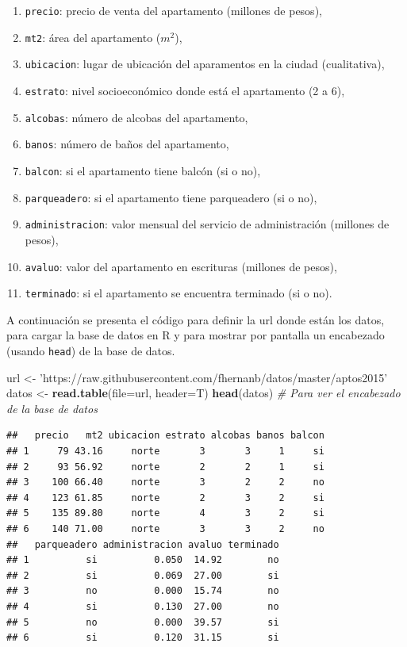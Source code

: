 \documentclass[10pt,]{krantz}
\makeatletter
\newenvironment{Shaded}{\begin{snugshade}}{\end{snugshade}}
\newcommand{\KeywordTok}[1]{\textcolor[rgb]{0.13,0.29,0.53}{\textbf{#1}}}
\newcommand{\DataTypeTok}[1]{\textcolor[rgb]{0.13,0.29,0.53}{#1}}
\newcommand{\StringTok}[1]{\textcolor[rgb]{0.31,0.60,0.02}{#1}}
\newcommand{\CommentTok}[1]{\textcolor[rgb]{0.56,0.35,0.01}{\textit{#1}}}
\newcommand{\NormalTok}[1]{#1}
\providecommand{\tightlist}{%
  \setlength{\itemsep}{0pt}\setlength{\parskip}{0pt}}
\newenvironment{kframe}{%
\medskip{}
\setlength{\fboxsep}{.8em}
 \def\at@end@of@kframe{}%
 \ifinner\ifhmode%
  \def\at@end@of@kframe{\end{minipage}}%
  \begin{minipage}{\columnwidth}%
 \fi\fi%
 \def\FrameCommand##1{\hskip\@totalleftmargin \hskip-\fboxsep
 \colorbox{shadecolor}{##1}\hskip-\fboxsep
     \hskip-\linewidth \hskip-\@totalleftmargin \hskip\columnwidth}%
 \MakeFramed {\advance\hsize-\width
   \@totalleftmargin\z@ \linewidth\hsize
   \@setminipage}}%
 {\par\unskip\endMakeFramed%
 \at@end@of@kframe}
\renewenvironment{Shaded}{\begin{kframe}}{\end{kframe}}
\makeatother
\begin{document}
\begin{enumerate}
\def\labelenumi{\arabic{enumi}.}
\tightlist
\item
  \texttt{precio}: precio de venta del apartamento (millones de pesos),
\item
  \texttt{mt2}: área del apartamento (\(m^2\)),
\item
  \texttt{ubicacion}: lugar de ubicación del aparamentos en la ciudad
  (cualitativa),
\item
  \texttt{estrato}: nivel socioeconómico donde está el apartamento (2 a
  6),
\item
  \texttt{alcobas}: número de alcobas del apartamento,
\item
  \texttt{banos}: número de baños del apartamento,
\item
  \texttt{balcon}: si el apartamento tiene balcón (si o no),
\item
  \texttt{parqueadero}: si el apartamento tiene parqueadero (si o no),
\item
  \texttt{administracion}: valor mensual del servicio de administración
  (millones de pesos),
\item
  \texttt{avaluo}: valor del apartamento en escrituras (millones de
  pesos),
\item
  \texttt{terminado}: si el apartamento se encuentra terminado (si o
  no).
\end{enumerate}

A continuación se presenta el código para definir la url donde están los
datos, para cargar la base de datos en R y para mostrar por pantalla un
encabezado (usando \texttt{head}) de la base de datos.

\begin{Shaded}
\begin{Highlighting}[]
\NormalTok{url <-}\StringTok{ 'https://raw.githubusercontent.com/fhernanb/datos/master/aptos2015'}
\NormalTok{datos <-}\StringTok{ }\KeywordTok{read.table}\NormalTok{(}\DataTypeTok{file=}\NormalTok{url, }\DataTypeTok{header=}\NormalTok{T)}
\KeywordTok{head}\NormalTok{(datos)  }\CommentTok{# Para ver el encabezado de la base de datos}
\end{Highlighting}
\end{Shaded}

\begin{verbatim}
##   precio   mt2 ubicacion estrato alcobas banos balcon
## 1     79 43.16     norte       3       3     1     si
## 2     93 56.92     norte       2       2     1     si
## 3    100 66.40     norte       3       2     2     no
## 4    123 61.85     norte       2       3     2     si
## 5    135 89.80     norte       4       3     2     si
## 6    140 71.00     norte       3       3     2     no
##   parqueadero administracion avaluo terminado
## 1          si          0.050  14.92        no
## 2          si          0.069  27.00        si
## 3          no          0.000  15.74        no
## 4          si          0.130  27.00        no
## 5          no          0.000  39.57        si
## 6          si          0.120  31.15        si
\end{verbatim}
\end{document}
